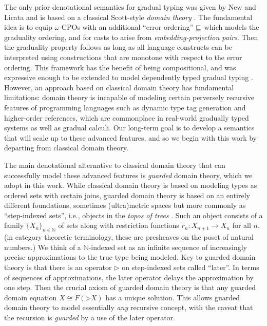 The only prior denotational semantics for gradual typing was given by
New and Licata and is based on a classical Scott-style \emph{domain
theory} \cite{new-licata18}. The fundamental idea is to equip
$\omega$-CPOs with an additional ``error ordering'' $\sqsubseteq$ which
models the graduality ordering, and for casts to arise from
\emph{embedding-projection pairs}. Then the graduality property
follows as long as all language constructs can be interpreted using
constructions that are monotone with respect to the error ordering.
%
This framework has the benefit of being compositional, and was
expressive enough to be extended to model dependently typed gradual
typing \cite{gradualizing-cic}.
%
However, an approach based on classical domain theory has fundamental
limitations: domain theory is incapable of modeling certain perversely
recursive features of programming languages such as dynamic type tag
generation and higher-order references, which are commonplace in
real-world gradually typed systems as well as gradual calculi.
%
Our long-term goal is to develop a semantics that will scale up to these
advanced features, and so we begin with this work by departing from
classical domain theory.

The main denotational alternative to classical domain theory that can
successfully model these advanced features is \emph{guarded} domain
theory, which we adopt in this work. While classical domain theory is
based on modeling types as ordered sets with certain joins, guarded
domain theory is based on an entirely different foundations, sometimes
(ultra)metric spaces but more commonly as ``step-indexed sets'', i.e.,
objects in the \emph{topos of trees}
\cite{birkedal-mogelberg-schwinghammer-stovring2011}.  Such an object
consists of a family $\{X_n\}_{n \in \mathbb{N}}$ of sets along with
restriction functions $r_n : X_{n+1} \to X_n$ for all $n$.  (in
category theoretic terminology, these are presheaves on the poset of
natural numbers.)  We think of a $\mathbb{N}$-indexed set as an infinite
sequence of increasingly precise approximations to the true type being
modeled.
%
Key to guarded domain theory is that there is an operator
$\triangleright$ on step-indexed sets called ``later''. In terms of
sequences of approximations, the later operator delays the
approximation by one step. Then the crucial axiom of guarded domain
theory is that any guarded domain equation $X \cong F(\triangleright
X)$ has a unique solution. This allows guarded domain theory to model
essentially \emph{any} recursive concept, with the caveat that the
recursion is \emph{guarded} by a use of the later operator.

